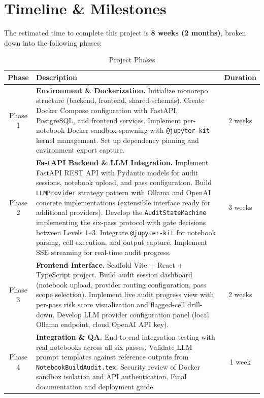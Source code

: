 \documentclass[11pt, a4paper]{article}
\begin{document}
\section{Timeline \& Milestones}

The estimated time to complete this project is \textbf{8 weeks (2 months)}, broken down into
the following phases:

\begin{table}[H]
  \centering
  \caption{Project Phases}
  \label{tab:phases}
  \renewcommand{\arraystretch}{1.4}
  \begin{tabularx}{\textwidth}{c Y c}
    \toprule
    \textbf{Phase} & \textbf{Description} & \textbf{Duration} \\
    \midrule
    Phase 1 &
    \textbf{Environment \& Dockerization.} Initialize monorepo structure (backend,
    frontend, shared schemas). Create Docker Compose configuration with FastAPI,
    PostgreSQL, and frontend services. Implement per-notebook Docker sandbox
    spawning with \texttt{@jupyter-kit} kernel management. Set up dependency
    pinning and environment export capture. &
    2 weeks \\

    Phase 2 &
    \textbf{FastAPI Backend \& LLM Integration.} Implement FastAPI REST API with
    Pydantic models for audit sessions, notebook upload, and pass configuration.
    Build \texttt{LLMProvider} strategy pattern with Ollama and OpenAI
    concrete implementations (extensible interface ready for additional providers).
    Develop the \texttt{AuditStateMachine}
    implementing the six-pass protocol with gate decisions between Levels 1--3.
    Integrate \texttt{@jupyter-kit} for notebook parsing, cell execution, and
    output capture. Implement SSE streaming for real-time audit progress. &
    3 weeks \\

    Phase 3 &
    \textbf{Frontend Interface.} Scaffold Vite + React + TypeScript project. Build
    audit session dashboard (notebook upload, provider routing configuration, pass
    scope selection). Implement live audit progress view with per-pass risk score
    visualization and flagged-cell drill-down. Develop
    LLM provider configuration panel (local Ollama endpoint, cloud OpenAI API key). &
    2 weeks \\

    Phase 4 &
    \textbf{Integration \& QA.} End-to-end integration testing with real notebooks
    across all six passes. Validate LLM prompt templates against reference outputs
    from \texttt{NotebookBuildAudit.tex}. Security review of Docker sandbox isolation
    and API authentication. Final documentation and deployment guide. &
    1 week \\

    \bottomrule
  \end{tabularx}
\end{table}
\end{document}
